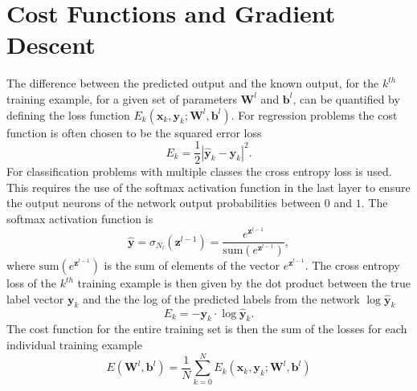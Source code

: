 \documentclass{article}
\begin{document}
\section*{Cost Functions and Gradient Descent}
The difference between the predicted output and the known output, for the $k^{th}$ training example, for a given set of parameters $\textbf{W}^l$ and $\textbf{b}^l$, can be quantified by defining the loss function $E_k(\textbf{x}_k, \textbf{y}_k ; \textbf{W}^l, \textbf{b}^l)$. For regression problems the cost function is often chosen to be the squared error loss
\begin{equation}
E_k = \frac{1}{2} \left |\hat{\textbf{y}}_k - \textbf{y}_k \right|^2.
\end{equation}
For classification problems with multiple classes the cross entropy loss is used. This requires the use of the softmax activation function in the last layer to ensure the output neurons of the network output probabilities between $0$ and $1$. The softmax activation function is
\begin{equation}
\hat{\textbf{y}} = \sigma_{N_l}(\textbf{z}^{l-1}) = \frac{e^{\textbf{z}^{l-1}}}{\text{sum} \left( e^{\textbf{z}^{l-1}} \right)},
\end{equation}
where $\text{sum} \left( e^{\textbf{z}^{l-1}} \right)$ is the sum of elements of the vector $e^{\textbf{z}^{l-1}}$. The cross entropy loss of the $k^{th}$ training example is then given by the dot product between the true label vector $\textbf{y}_k$ and the the log of the predicted labels from the network $\log{\hat{\textbf{y}}_k}$
\begin{equation}
E_k = - \textbf{y}_k \cdot \log{\hat{\textbf{y}}_k}.
\end{equation} 
The cost function for the entire training set is then the sum of the losses for each individual training example
\begin{equation}
E \left(\textbf{W}^l, \textbf{b}^l \right) = \frac{1}{N} \sum_{k=0}^N E_k(\textbf{x}_k, \textbf{y}_k ; \textbf{W}^l, \textbf{b}^l) 
\end{equation}
\end{document}
